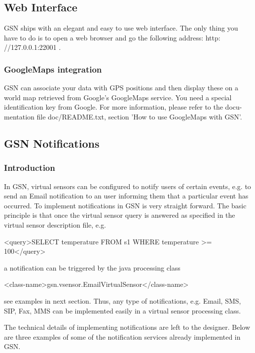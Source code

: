 \subsection{Web Interface}

GSN ships with an elegant and easy to use web interface. The only thing
you have to do is to open a web browser and go the following address: http:
//127.0.0.1:22001 .

\subsubsection{GoogleMaps integration}
GSN can associate your data with GPS positions and then display these on
a world map retrieved from Google's GoogleMaps service. You need a special
identification key from Google. For more information, please refer to the docu-
mentation file doc/README.txt, section 'How to use GoogleMaps with GSN'.

\subsection{GSN Notifications}

\subsubsection{Introduction}

In GSN, virtual sensors can be configured to notify users of certain events, e.g. to send an Email notification to an user informing them that a particular event has occurred. To implement notifications in GSN is very straight forward. The basic principle is that once the virtual sensor query is answered as specified in the virtual sensor description file, e.g.

\begin{xmlcode}
<query>SELECT temperature FROM s1 WHERE temperature >= 100</query>
\end{xmlcode}

a notification can be triggered  by the java processing class

\begin{xmlcode}
<class-name>gsn.vsensor.EmailVirtualSensor</class-name>
\end{xmlcode}

see examples in next section. Thus, any type of notifications, e.g. Email, SMS, SIP, Fax, MMS can be implemented easily in a virtual sensor processing class. 

The technical details of implementing notifications are left to the designer. Below are three examples of some of the notification services already implemented in GSN.


